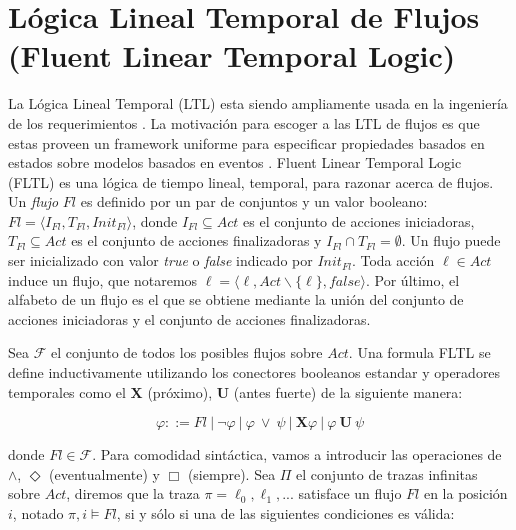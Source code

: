 \section{Lógica Lineal Temporal de Flujos (Fluent Linear Temporal Logic)}

La Lógica Lineal Temporal (LTL) esta siendo ampliamente usada en la ingeniería de los requerimientos
\cite{1347546,Giannakopoulou:2003:FMC:940071.940106,879820,Letier:2002:ATG:581339.581353}. La motivación para escoger a
las LTL de flujos es que estas proveen un framework uniforme para especificar propiedades basados en estados sobre
modelos basados en eventos \cite{Giannakopoulou:2003:FMC:940071.940106}. Fluent Linear Temporal Logic (FLTL) \cite{Giannakopoulou:2003:FMC:940071.940106}
es una lógica de tiempo lineal, temporal, para razonar acerca de flujos. Un \emph{flujo} $Fl$ es definido por un par de
conjuntos y un valor booleano: $Fl = \langle I_{Fl},T_{Fl},Init_{Fl}\rangle$, donde $I_{Fl} \subseteq Act$ es el
conjunto de acciones iniciadoras, $T_{Fl} \subseteq Act$ es el conjunto de acciones finalizadoras y $I_{Fl} \cap T_{Fl}
= \emptyset$. Un flujo puede ser inicializado con valor \emph{true} o \emph{false} indicado por $Init_{Fl}$. Toda acción $\ell \in
Act$ induce un flujo, que notaremos $\ell = \langle\ell, Act \backslash \{\ell\}, false\rangle$. Por último, el alfabeto
de un flujo es el que se obtiene mediante la unión del conjunto de acciones iniciadoras y el conjunto de acciones
finalizadoras.

Sea $\mathcal{F}$ el conjunto de todos los posibles flujos sobre $Act$. Una formula FLTL se define inductivamente
utilizando los conectores booleanos estandar y operadores temporales como el $\mathbf{X}$ (próximo), $\mathbf{U}$ (antes
fuerte) de la siguiente manera:

\begin{center}
\begin{equation}
    \varphi ::= Fl\ |\ \neg\varphi\ |\ \varphi\ \lor\ \psi\ |\ \mathbf{X} \varphi\ |\ \varphi\ \mathbf{U}\ \psi
\end{equation}
\end{center}

\noindent donde $Fl \in \mathcal{F}$. Para comodidad sintáctica, vamos a introducir las operaciones de $\land$,
$\Diamond$ (eventualmente) y $\Box$ (siempre). Sea $\Pi$ el conjunto de trazas infinitas sobre $Act$, diremos que la
traza $\pi = \ell_0,\ell_1,...$ satisface un flujo $Fl$ en la posición $i$, notado $\pi,i\vDash Fl$, si y sólo si una de
las siguientes condiciones es válida:

